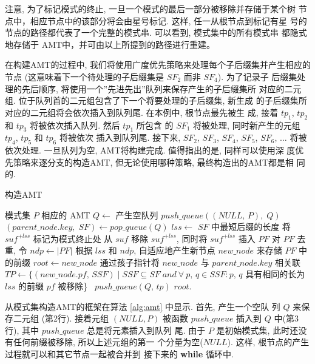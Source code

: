 \documentclass{ws-ijprai}
\begin{document}
注意, 为了标记模式的终止, 一旦一个模式的最后一部分被移除并存储于某个树
节点中，相应节点中的该部分将会由星号标记. 这样, 任一从根节点到标记有星
号的节点的路径都代表了一个完整的模式串. 可以看到, 模式集中的所有模式串
都隐式地存储于 AMT中，并可由以上所提到的路径进行重建。

在构建AMT的过程中, 我们将使用广度优先策略来处理每个子后缀集并产生相应的
节点 (这意味着下一个待处理的子后缀集是 $SF_2$ 而非 $SF_4$). 为了记录子
后缀集处理的先后顺序, 将使用一个''先进先出''队列来保存产生的子后缀集所
对应的二元组. 位于队列首的二元组包含了下一个将要处理的子后缀集, 新生成
的子后缀集所对应的二元组将会依次插入到队列尾. 在本例中, 根节点最先被生
成, 接着 $tp_1$, $tp_2$ 和 $tp_3$ 将被依次插入队列. 然后 $tp_1$ 所包含
的 $SF_1$ 将被处理, 同时新产生的元组 $tp_4$, $tp_5$ 和 $tp_6$ 将被依次
插入到队列尾. 接下来, $SF_2$, $SF_3$, $SF_4$, $SF_5$, $SF_6$, $\dots$
将被依次处理. 一旦队列为空, AMT将构建完成. 值得指出的是, 同样可以使用深
度优先策略来逐分支的构造AMT, 但无论使用哪种策略, 最终构造出的AMT都是相
同的.


\begin{algorithm}
  \caption{构造AMT}\scriptsize
  \label{alg:amt}
  \begin{algorithmic}[1]
    \REQUIRE 模式集 $P$
    \ENSURE  相应的 AMT
    \STATE
    \STATE $Q \leftarrow$ 产生空队列
    \STATE $push\_queue((NULL,\,P),\; Q)$
    \STATE
    \STATE $(parent\_node.key,\; SF) \leftarrow pop\_queue(Q)$
    \STATE $lss \leftarrow$ $SF$ 中最短后缀的长度
    \STATE 将 $suf^{+lss}$ 标记为模式终止处
    \ENDIF
    \STATE   从 $suf$ 移除 $suf^{+lss}$, 同时将 $suf^{+lss}$ 插入 $PF$
    \ENDFOR
    \STATE 对 $PF$ 去重, 令 $ndp \leftarrow |PF|$
    \STATE 根据 $lss$ 和 $ndp$, 自适应地产生新节点
    $new\_node$ 来存储 $PF$ 中的前缀
    \STATE $root \leftarrow new\_node$
    \ELSE
    \STATE 通过孩子指针将 $new\_node$
    与 $parent\_node.key$ 相关联
    \ENDIF
    \STATE $TP \leftarrow \{(new\_node.pf,\, SSF) \mid SSF \subseteq SF\; and
    \ \forall \ p,\,q \in SSF: p,\,q$ 具有相同的长为 $lss$ 的前缀
    $pf$ 被移除\}\
    \STATE $push\_queue(Q,\,tp)$
    \ENDFOR
    \ENDWHILE
    \STATE
    \RETURN $root$.
  \end{algorithmic}
\end{algorithm}

从模式集构造AMT的框架在算法 \ref{alg:amt} 中显示. 首先, 产生一个空队
列 $Q$ 来保存二元组 (第2行). 接着元组 $(NULL, P)$ 被函数 $push\_queue$
插入到 $Q$ 中(第3行), 其中 $push\_queue$ 总是将元素插入到队列
尾. 由于 $P$ 是初始模式集, 此时还没有任何前缀被移除, 所以上述元组的第一
个分量为空($NULL$). 这样, 根节点的产生过程就可以和其它节点一起被合并到
接下来的 \textbf{while} 循环中.
\end{document}
